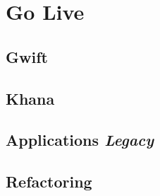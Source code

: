 \documentclass[a4paper,12pt]{book}
\begin{document}
\part{Go Live}
\chapter{Gwift}

\chapter{Khana}

\chapter{Applications \textit{Legacy}}

\chapter{Refactoring}

\backmatter
\end{document}
